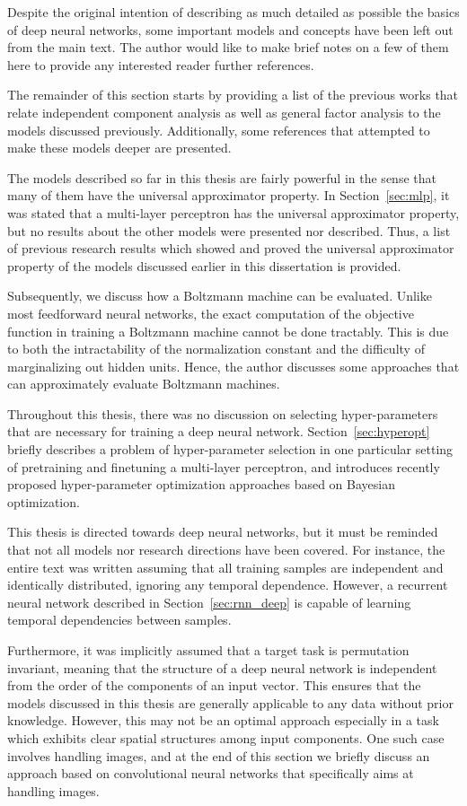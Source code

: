 \documentclass[dissertation,nocontribution,draft*]{aaltoseries}
\begin{document}
Despite the original intention of describing as much
detailed
as possible the basics of deep neural networks, some
important models and concepts have been left out from the main
text. The author would like to make brief notes on a few of
them here to provide any interested reader further
references.

The remainder of this section starts by providing a list of
the previous works that relate independent component
analysis as well as general factor analysis to the models
discussed previously.  Additionally, some references that
attempted to make these models deeper are presented.  

The models described so far in this thesis are fairly
powerful in the sense that many of them have the universal
approximator property. In Section~\ref{sec:mlp}, it was
stated that a multi-layer perceptron has the universal
approximator property, but no results about the other models
were presented nor described. Thus, a list of previous
research results which showed and proved the universal approximator
property of the models discussed earlier in this
dissertation is provided.

Subsequently, we discuss how a Boltzmann machine can be
evaluated. Unlike most feedforward neural
networks, the exact computation of the objective function in
training a Boltzmann machine cannot be done tractably. This
is due to both the intractability of the normalization
constant and the difficulty of marginalizing out hidden
units. Hence, the author discusses some approaches that can
approximately evaluate Boltzmann machines.

Throughout this thesis, there was no discussion on selecting
hyper-parameters that are necessary for training a deep
neural network. Section~\ref{sec:hyperopt} briefly describes
a problem of hyper-parameter selection in one particular
setting of pretraining and finetuning a multi-layer
perceptron, and introduces recently proposed
hyper-parameter optimization approaches based on Bayesian
optimization.

This thesis is directed towards deep neural networks, but it must be
reminded that not all models nor research directions have
been covered. For instance, the entire text was written
assuming that all training samples are independent and
identically distributed, ignoring any temporal dependence.
However, a recurrent neural network described in
Section~\ref{sec:rnn_deep} is capable of learning temporal
dependencies between samples.

Furthermore, it was implicitly assumed that a target task is
permutation invariant, meaning that the structure of a deep
neural network is independent from the order of the
components of an input vector. This ensures that the models
discussed in this thesis are generally applicable to any
data without prior knowledge. However, this may not be an
optimal approach especially in a task which exhibits clear
spatial structures among input components. One such case
involves handling images, and at the end of this section we
briefly discuss an approach based on convolutional neural
networks that specifically aims at handling images.
\end{document}
